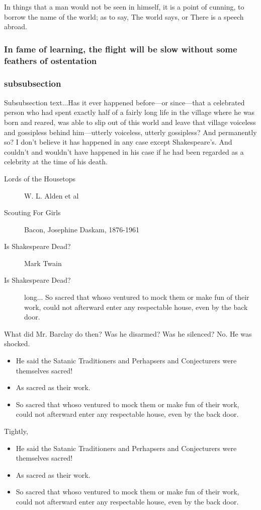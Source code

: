 \documentclass[a4paper, 12pt]{memoir}
\begin{document}
In things that a man would not be seen in himself, it is a point of cunning, to borrow the name of the world; as to say, The world says, or There is a speech abroad. 


\subsubsection*{ In fame of learning, the flight will be slow without some feathers of ostentation }
\subsubsection*{subsubsection} 
Subsubsection text...Has it ever happened before—or since—that a celebrated person who had spent exactly half of a fairly long life in the village where he was born and reared, was able to slip out of this world and leave that village voiceless and gossipless behind him—utterly voiceless, utterly gossipless?  And permanently so?  I don’t believe it has happened in any case except Shakespeare’s.  And couldn’t and wouldn’t have happened in his case if he had been regarded as a celebrity at the time of his death.
\begin{description} 
\item[Lords of the Housetops]W. L. Alden et al 
\item[Scouting For Girls] Bacon, Josephine Daskam, 1876-1961
\item[Is Shakespeare Dead?] Mark Twain
\item[Is Shakespeare Dead?]  long... So sacred that whoso ventured to mock them or make fun of their work, could not afterward enter any respectable house, even by the back door.
\end{description}

What did Mr. Barclay do then?  Was he disarmed?  Was he silenced?  No.  He was shocked.

\begin{itemize}[•\textbullet ] 
\item He said the Satanic Traditioners and Perhapsers and Conjecturers were themselves sacred!
\item  As sacred as their work.
\item  So sacred that whoso ventured to mock them or make fun of their work, could not afterward enter any respectable house, even by the back door.
\end{itemize}

Tightly,

\tightlists
\begin{itemize}[•\textbullet ] 
\item He said the Satanic Traditioners and Perhapsers and Conjecturers were themselves sacred!
\item  As sacred as their work.
\item  So sacred that whoso ventured to mock them or make fun of their work, could not afterward enter any respectable house, even by the back door.
\end{itemize}
\end{document}
